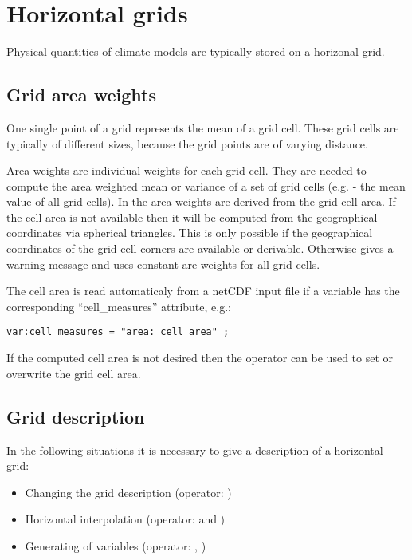 \section{Horizontal grids}
\label{HORIZONTAL_GRIDS}

Physical quantities of climate models are typically stored on a
horizonal grid. 

\subsection{Grid area weights}
\label{GRID_AREA_WEIGHTS}

One single point of a grid represents the mean of a grid cell.
These grid cells are typically of different sizes, because the grid
points are of varying distance.

Area weights are individual weights for each grid cell. 
They are needed to compute the area weighted mean or
variance of a set of grid cells (e.g.  - the mean value of all grid cells).
In {\CDO} the area weights are derived from the grid cell area.
If the cell area is not available then it will be computed from the geographical coordinates via spherical triangles.
This is only possible if the geographical coordinates of the grid cell corners are available or derivable.
Otherwise {\CDO} gives a warning message and uses constant are weights for all grid cells.

The cell area is read automaticaly from a netCDF input file if a variable has the
corresponding ``cell\_measures'' attribute, e.g.:

\begin{lstlisting}[frame=single, backgroundcolor=\color{pcolor1}, basicstyle=\small]
var:cell_measures = "area: cell_area" ;
\end{lstlisting}

If the computed cell area is not desired 
then the {\CDO} operator  can be used to
set or overwrite the grid cell area.

\subsection{Grid description}
\label{GRID_DESCRIPTION}

In the following situations it is necessary to give a description of a horizontal grid:

\begin{itemize}
\item Changing the grid description (operator: )
\item Horizontal interpolation (operator:  and )
\item Generating of variables (operator: , )
\end{itemize}

